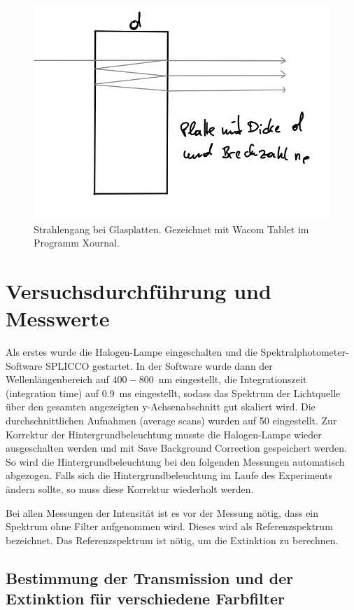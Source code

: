 \documentclass{article}
\begin{document}
\begin{figure}[H]
\caption{Strahlengang bei Glasplatten. Gezeichnet mit Wacom Tablet im Programm Xournal.}
\label{fig:aufbau2}
\includegraphics[scale=1.]{aufbau3.png}
\end{figure}



\section{Versuchsdurchführung und Messwerte}

Als erstes wurde die Halogen-Lampe eingeschalten und die Spektralphotometer-Software SPLICCO gestartet. In der Software wurde dann der Wellenlängenbereich auf $400-800$~nm eingestellt, die Integrationszeit (integration time) auf $0.9$~ms eingestellt, sodass das Spektrum der Lichtquelle über den gesamten angezeigten y-Achsenabschnitt gut skaliert wird. Die durchschnittlichen Aufnahmen (average scans) wurden auf 50 eingestellt.
Zur Korrektur der Hintergrundbeleuchtung musste die Halogen-Lampe wieder ausgeschalten werden und mit Save Background Correction gespeichert werden. So wird die Hintergrundbeleuchtung bei den folgenden Messungen automatisch abgezogen. Falls sich die Hintergrundbeleuchtung im Laufe des Experiments ändern sollte, so muss diese Korrektur wiederholt werden.

Bei allen Messungen der Intensität ist es vor der Messung nötig, dass ein Spektrum ohne Filter aufgenommen wird. Dieses wird als Referenzspektrum bezeichnet. Das Referenzspektrum ist nötig, um die Extinktion zu berechnen.

\subsection{Bestimmung der Transmission und der Extinktion für verschiedene Farbfilter}
\end{document}

